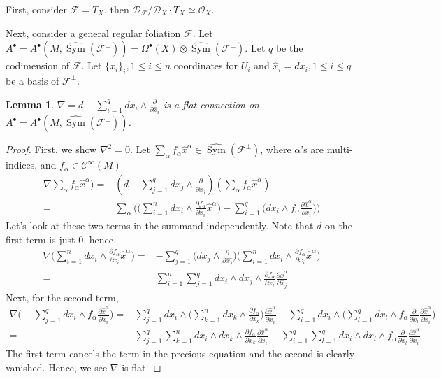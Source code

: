 \documentclass[12pt]{amsart}
\newtheorem{lem}[thm]{Lemma}
\theoremstyle{definition}
\theoremstyle{remark}
\numberwithin{equation}{section}
\newcommand{\del}{\partial}
\renewcommand{\del}{\partial}
\newcommand{\CF}{{\mathcal F}}
\newcommand{\CO}{{\mathcal O}}
\newcommand{\D}{{\mathcal D}}
\newcommand{\cinf}{{\mathcal C}^{\infty}}
\newcommand{\A}{{A}}
\newcommand{\1}{{\mathbb{1}}}
\newcommand{\sym}{\operatorname{Sym}}
\begin{document}
First, consider $\CF = T_X$, then $\D_{\CF} / \D_X\cdot T_X \simeq \CO_X$.


Next, consider a general regular foliation $\CF$. Let $\A^{\bullet}= \A^{\bullet}(M, \widehat{\sym}(\CF^{\perp}))= \Omega^{\bullet}(X)\otimes \widehat{\sym}(\CF^{\perp})$. Let $q$ be the codimension of $\CF$. Let $\{x_i\}_i, 1\le i \le n$ coordinates for $U_i$ and $\hat{x}_i = dx_i, 1\le i \le q$ be a basis of $\CF^{\perp}$.

\begin{lem}
	$\nabla = d - \sum_{i=1}^q dx_i\wedge \frac{\del}{\del \hat{x}_i} $ is a flat connection on $\A^{\bullet}= \A^{\bullet}(M, \widehat{\sym}(\CF^{\perp}))$.
\end{lem}

\begin{proof}First, we show $\nabla^2 = 0$. 	Let $\sum_{\alpha}^{}f_{\alpha} \hat{x}^{\alpha} \in  \widehat{\sym}(\CF^{\perp})$, where $\alpha$'s are multi-indices, and $f_{\alpha} \in \cinf(M)$
	\begin{align*}
	\nabla\sum_{\alpha}^{}f_{\alpha}\hat{x}^{\alpha} ) =& ( d - \sum_{j=1}^q dx_j\wedge \frac{\del}{\del \hat{x}_j}) (\sum_{\alpha}^{}f_{\alpha}\hat{x}^{\alpha} ) \\
	=&
	\sum_{\alpha}\bigg(\Big(\sum_{i=1}^{n}dx_i \wedge  \frac{\del f_{\alpha}}{ \del x_i} \hat{x}^{\alpha}\Big) - \sum_{i=1}^q \Big( dx_i \wedge f_{\alpha}\frac{\del \hat{x}^{\alpha}}{\del \hat{x}_i}\Big)\bigg)
	\end{align*}
		Let's look at these two terms in the summand independently. Note that $d$ on the first term is just 0, hence
	\begin{align*}
	\nabla\Big(\sum_{i=1}^{n}dx_i \wedge  \frac{\del f_{\alpha}}{ \del x_i} \hat{x}^{\alpha}\Big) =& -\sum_{j=1}^q\Big(dx_j \wedge\frac{\del}{\del\hat{x_j}}\Big)\Big(\sum_{i=1}^{n}dx_i \wedge  \frac{\del f_{\alpha}}{ \del x_i} \hat{x}^{\alpha}\Big)\\
	=& \sum_{i=1}^{n} \sum_{j=1}^{q}dx_i\wedge dx_j \wedge \frac{\del f_{\alpha}}{ \del x_i} \frac{\del \hat{x}^{\alpha}}{\del \hat{x}_j}
	\end{align*}
	Next, for the second term, 
	\begin{align*}
	\nabla \Big(- \sum_{j=1}^q dx_i \wedge f_{\alpha}\frac{\del \hat{x}^{\alpha}}{\del \hat{x}_i}\Big)=& \sum_{j=1}^q dx_i \wedge \Big( \sum_{k=1}^ndx_k\wedge \frac{\del f_{\alpha}}{\del x_k}  \Big) \frac{\del \hat{x}^{\alpha}}{\del \hat{x}_i} - \sum_{i=1}^q dx_i \wedge \Big(\sum_{l=1}^q dx_l \wedge f_{\alpha} \frac{\del}{\del \hat{x_l}}  \frac{\del \hat{x}^{\alpha}}{\del \hat{x}_i}\Big)\\
	=& \sum_{j=1}^q \sum_{k=1}^n  dx_i \wedge  dx_k\wedge \frac{\del f_{\alpha}}{\del x_k}   \frac{\del \hat{x}^{\alpha}}{\del \hat{x}_i} - \sum_{i=1}^q\sum_{l=1}^q dx_i \wedge dx_l\wedge  f_{\alpha} \frac{\del}{\del \hat{x_l}}  \frac{\del \hat{x}^{\alpha}}{\del \hat{x}_i}
	\end{align*}
	The first term cancels the term in the precious equation and the second is clearly vanished. Hence, we see $\nabla$ is flat.
	

\end{proof}
\end{document}
